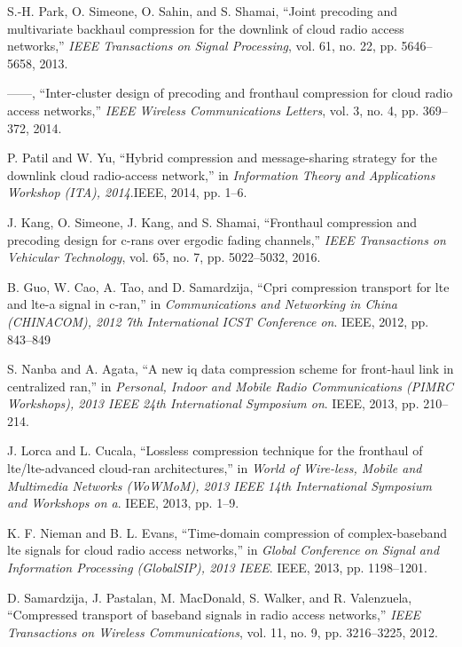\begin{multicols}{2}
\begin{thebibliography}{99}
 S.-H. Park, O. Simeone, O. Sahin, and S. Shamai, “Joint precoding and multivariate backhaul compression for the downlink of cloud radio access networks,” \textit{IEEE Transactions on Signal Processing}, vol. 61, no. 22, pp. 5646–5658, 2013.

 ——, “Inter-cluster design of precoding and fronthaul compression for cloud radio access networks,” \textit{IEEE Wireless Communications Letters}, vol. 3, no. 4, pp. 369–372, 2014.

 P. Patil and W. Yu, “Hybrid compression and message-sharing strategy for the downlink cloud radio-access network,” in \textit{Information Theory and Applications Workshop (ITA), 2014}.\break IEEE, 2014, pp. 1–6. 

 J. Kang, O. Simeone, J. Kang, and S. Shamai, “Fronthaul compression and precoding design for c-rans over ergodic fading channels,” \textit{IEEE Transactions on Vehicular Technology}, vol. 65, no. 7, pp. 5022–5032, 2016.

 B. Guo, W. Cao, A. Tao, and D. Samardzija, “Cpri compression transport for lte and lte-a signal in c-ran,” in \textit{Communications and Networking in China (CHINACOM), 2012 7th International ICST Conference on}. IEEE, 2012, pp. 843–849

 S. Nanba and A. Agata, “A new iq data compression scheme for front-haul link in centralized ran,” in \textit{Personal, Indoor and Mobile Radio Communications (PIMRC Workshops), 2013 IEEE 24th International Symposium on}. IEEE, 2013, pp. 210–214.

 J. Lorca and L. Cucala, “Lossless compression technique for the fronthaul of lte/lte-advanced cloud-ran architectures,” in \textit{World of Wire-less, Mobile and Multimedia Networks (WoWMoM), 2013 IEEE 14th International Symposium and Workshops on a}. IEEE, 2013, pp. 1–9.

 K. F. Nieman and B. L. Evans, “Time-domain compression of complex-baseband lte signals for cloud radio access networks,” in \textit{Global Conference on Signal and Information Processing (GlobalSIP), 2013 IEEE}. IEEE, 2013, pp. 1198–1201.

 D. Samardzija, J. Pastalan, M. MacDonald, S. Walker, and R. Valenzuela, “Compressed transport of baseband signals in radio access networks,” \textit{IEEE Transactions on Wireless Communications}, vol. 11, no. 9, pp. 3216–3225, 2012.


\end{thebibliography}
\end{multicols}
